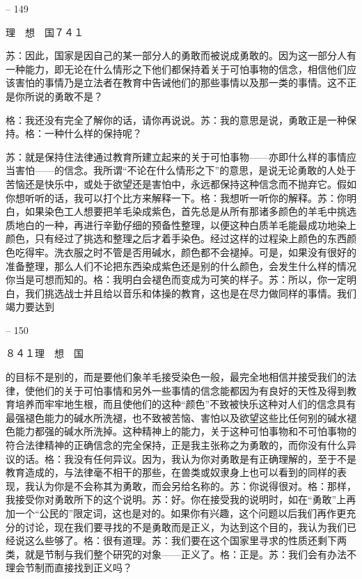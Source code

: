 \documentclass[11pt,oneside]{book}
\begin{document}
\begin{common-format}
    

-- 149

    理　想　国７４１

    苏：因此，国家是因自己的某一部分人的勇敢而被说成勇敢的。因为这一部分人有一种能力，即无论在什么情形之下他们都保持着关于可怕事物的信念，相信他们应该害怕的事情乃是立法者在教育中告诫他们的那些事情以及那一类的事情。这不正是你所说的勇敢不是？

    格：我还没有完全了解你的话，请你再说说。苏：我的意思是说，勇敢正是一种保持。格：一种什么样的保持呢？

    苏：就是保持住法律通过教育所建立起来的关于可怕事物——亦即什么样的事情应当害怕——的信念。我所谓“不论在什么情形之下”的意思，是说无论勇敢的人处于苦恼还是快乐中，或处于欲望还是害怕中，永远都保持这种信念而不抛弃它。假如你想听听的话，我可以打个比方来解释一下。格：我想听一听你的解释。苏：你明白，如果染色工人想要把羊毛染成紫色，首先总是从所有那诸多颜色的羊毛中挑选质地白的一种，再进行辛勤仔细的预备性整理，以便这种白质羊毛能最成功地染上颜色，只有经过了挑选和整理之后才着手染色。经过这样的过程染上颜色的东西颜色吃得牢。洗衣服之时不管是否用碱水，颜色都不会褪掉。可是，如果没有很好的准备整理，那么人们不论把东西染成紫色还是别的什么颜色，会发生什么样的情况你当是可想而知的。格：我明白会褪色而变成为可笑的样子。苏：所以，你一定明白，我们挑选战士并且给以音乐和体操的教育，这也是在尽力做同样的事情。我们竭力要达到

    

-- 150

    ８４１理　想　国

    的目标不是别的，而是要他们象羊毛接受染色一般，最完全地相信并接受我们的法律，使他们的关于可怕事情和另外一些事情的信念能都因为有良好的天性及得到教育培养而牢牢地生根，而且使他们的这种“颜色”不致被快乐这种对人们的信念具有最强褪色能力的碱水所洗褪，也不致被苦恼、害怕以及欲望这些比任何别的碱水褪色能力都强的碱水所洗掉。这种精神上的能力，关于这种可怕事物和不可怕事物的符合法律精神的正确信念的完全保持，正是我主张称之为勇敢的，而你没有什么异议的话。格：我没有任何异议。因为，我认为你对勇敢是有正确理解的，至于不是教育造成的，与法律毫不相干的那些，在兽类或奴隶身上也可以看到的同样的表现，我认为你是不会称其为勇敢，而会另给名称的。苏：你说得很对。格：那样，我接受你对勇敢所下的这个说明。苏：好。你在接受我的说明时，如在“勇敢”上再加一个“公民的”限定词，这也是对的。如果你有兴趣，这个问题以后我们再作更充分的讨论，现在我们要寻找的不是勇敢而是正义，为达到这个目的，我认为我们已经说这么些够了。格：很有道理。苏：我们要在这个国家里寻求的性质还剩下两类，就是节制与我们整个研究的对象——正义了。格：正是。苏：我们会有办法不理会节制而直接找到正义吗？


\end{common-format}
\end{document}

